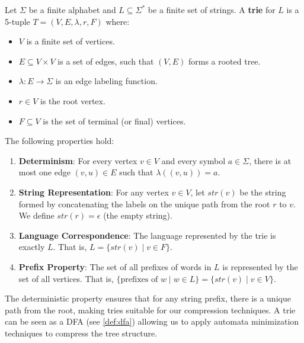 \begin{definition}[Trie] \label{def:trie}
Let $\Sigma$ be a finite alphabet and $L \subseteq \Sigma^*$ be a finite set of strings. A \textbf{trie} for $L$ is a 5-tuple $T = (V, E, \lambda, r, F)$ where:
\begin{itemize}
    \item $V$ is a finite set of vertices.
    \item $E \subseteq V \times V$ is a set of edges, such that $(V,E)$ forms a rooted tree.
    \item $\lambda: E \to \Sigma$ is an edge labeling function.
    \item $r \in V$ is the root vertex.
    \item $F \subseteq V$ is the set of terminal (or final) vertices.
\end{itemize}
The following properties hold:
\begin{enumerate}
    \item \textbf{Determinism}: For every vertex $v \in V$ and every symbol $a \in \Sigma$, there is at most one edge $(v, u) \in E$ such that $\lambda((v, u)) = a$.
    \item \textbf{String Representation}: For any vertex $v \in V$, let $str(v)$ be the string formed by concatenating the labels on the unique path from the root $r$ to $v$. We define $str(r) = \epsilon$ (the empty string).
    \item \textbf{Language Correspondence}: The language represented by the trie is exactly $L$. That is, $L = \{str(v) \mid v \in F\}$.
    \item \textbf{Prefix Property}: The set of all prefixes of words in $L$ is represented by the set of all vertices. That is, $\{\text{prefixes of } w \mid w \in L\} = \{str(v) \mid v \in V\}$.
\end{enumerate}
\end{definition}

The deterministic property ensures that for any string prefix, there is a unique path from the root, making tries suitable for our compression techniques. A trie can be seen as a DFA (see \cref{def:dfa}) allowing us to apply automata minimization techniques to compress the tree structure.


